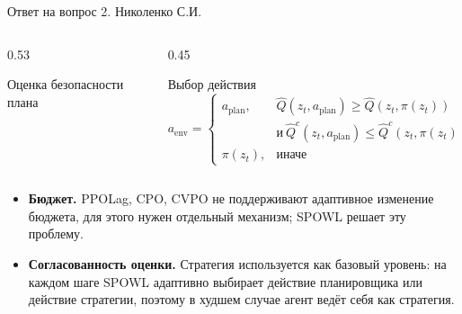 \begin{frame}[noframenumbering,shrink=8]{Ответ на вопрос 2. Николенко С.И.}
\begin{columns}[T,onlytextwidth]
\begin{column}{0.53\textwidth}
\begin{block}{Оценка безопасности плана}
            \end{block}
        \end{column}
        \begin{column}{0.45\textwidth}
            \begin{block}{Выбор действия}
                \vspace{-0.6em}
                \[
                    a_{\mathrm{env}} =
                    \begin{cases}
                        a_{\mathrm{plan}}, & \hat{Q}(z_t, a_{\mathrm{plan}}) \ge \hat{Q}(z_t, \pi(z_t)) \\
                                           & \text{и}\ \hat{Q}^c(z_t, a_{\mathrm{plan}}) \le \hat{Q}^c(z_t, \pi(z_t)), \\
                        \pi(z_t),          & \text{иначе}
                    \end{cases}
                \]
            \end{block}
        \end{column}
    \end{columns}
    \begin{itemize}
        \item \textbf{Бюджет.} PPOLag, CPO, CVPO не поддерживают адаптивное
              изменение бюджета, для этого нужен отдельный механизм; SPOWL
              решает эту проблему.
        \item \textbf{Согласованность оценки.} Стратегия используется как базовый уровень: на каждом шаге
              SPOWL адаптивно выбирает действие планировщика или действие
              стратегии, поэтому в худшем случае агент ведёт себя как
              стратегия.
    \end{itemize}
\end{frame}

